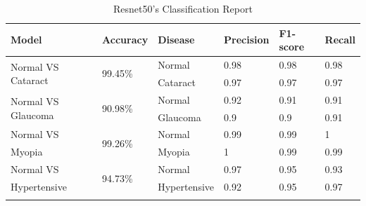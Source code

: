 \begin{table}[H]
\caption{Resnet50's Classification Report}
\centering
\begin{tabular}{|l|l|l|l|l|l|} 
\hline
Model                               & Accuracy                 & Disease              & Precision            & F1-score             & Recall                \\ 
\hline
\multirow{2}{*}{Normal VS Cataract} & \multirow{2}{*}{99.45\%} & Normal               & 0.98                 & 0.98                 & 0.98                  \\ 
\cline{3-6}
                                    &                          & Cataract             & 0.97                 & 0.97                 & 0.97                  \\ 
\hline
\multirow{2}{*}{Normal VS Glaucoma} & \multirow{2}{*}{90.98\%} & Normal               & 0.92                 & 0.91                 & 0.91                  \\ 
\cline{3-6}
                                    &                          & Glaucoma             & 0.9                  & 0.9                  & 0.91                  \\ 
\hline
Normal VS                           & \multirow{2}{*}{99.26\%} & Normal               & 0.99                 & 0.99                 & 1                     \\ 
\cline{3-6}
Myopia                              &                          & Myopia               & 1                    & 0.99                 & 0.99                  \\ 
\hline
Normal VS                           & \multirow{2}{*}{94.73\%} & Normal               & 0.97                 & 0.95                 & 0.93                  \\ 
\cline{3-6}
Hypertensive                        &                          & Hypertensive         & 0.92                 & 0.95                 & 0.97                  \\ 
\hline
\multicolumn{1}{l}{}                & \multicolumn{1}{l}{}     & \multicolumn{1}{l}{} & \multicolumn{1}{l}{} & \multicolumn{1}{l}{} & \multicolumn{1}{l}{} 
\end{tabular}
\end{table}
